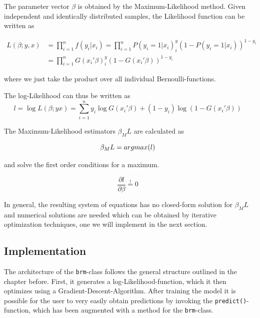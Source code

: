 \documentclass{article}
\begin{document}
The parameter vector $\beta$ is obtained by the Maximum-Likelihood method. Given independent and identically distributed samples, the Likelihood function can be written as

\begin{equation}
\begin{split}
L(\beta;y, x) &= \prod_{i=1}^{n} f(y_i | x_i)
              =\prod_{i=1}^{n} P(y_i=1|x_i)^y_i\left(1-P(y_i=1|x_i)\right)^{1-y_i} \\
            & =\prod_{i=1}^{n} G(x_i\prime \beta)^y_i\left(1-G(x_i\prime \beta)\right)^{1-y_i}
\end{split}
\end{equation}

where we just take the product over all individual Bernoulli-functions.

The log-Likelihood can thus be written as
\begin{equation}
\label{logL}
l = \log L(\beta;y x) = \sum_{i=1}^{n} y_i \log G(x_i\prime \beta) +(1-y_i) \log (1-G(x_i\prime \beta))
\end{equation}

The Maximum-Likelihood estimators $\beta_ML$ are calculated as

\begin{equation}
\beta_ML = argmax(l) \\
\end{equation}

and solve the first order conditions for a maximum.

\begin{equation}
\frac{\partial l}{\partial \beta} \stackrel{!}{=} 0
\end{equation}

In general, the resulting system of equations has no closed-form solution for $\beta_ML$ and numerical solutions are needed which can be obtained by iterative optimization techniques, one we will implement in the next section.

\subsection{Implementation}

The architecture of the \texttt{brm}-class follows the general structure outlined in the chapter before. First, it generates a log-Likelihood-function, which it then optimizes using a Gradient-Descent-Algorithm. After training the model it is possible for the user to very easily obtain predictions by invoking the \texttt{predict()}-function, which has been augmented with a method for the \texttt{brm}-class.
\end{document}
